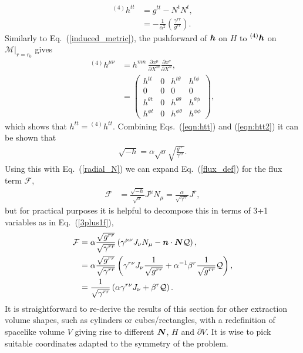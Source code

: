 \begin{align}
{}^{(4)}h^{tt} &=      g^{tt} - N^t N^t, \\
\label{eqn:htt2}&= -\frac{1}{\alpha^2}\left(\frac{\gamma^{rr}}{g^{rr}} \right).
\end{align}
Similarly to Eq.~(\ref{induced_metric}), the pushforward of $\boldsymbol h$ on $H$ to ${}^{(4)}\boldsymbol h$ on $\mathcal{M}\vert_{r=r_0}$ gives
\begin{align}
{}^{(4)} h^{\mu\nu}  &= h^{mn}\,\frac{\partial x^\mu}{\partial X^m} \frac{\partial x^\nu}{\partial X^n}, \\
 &= \begin{pmatrix} h^{tt}&0&h^{t\theta }&h^{t\phi} \\ 0&0&0&0 \\ h^{\theta t}&0&h^{\theta \theta }&h^{\theta \phi} \\ h^{\phi t}&0&h^{\phi\theta }&h^{\phi\phi} \end{pmatrix},
\end{align}
which shows that $h^{tt}={}^{(4)}h^{tt}$. Combining Eqs.~(\ref{eqn:htt}) and (\ref{eqn:htt2}) it can be shown that
\begin{align}
     \label{rootminushexpand}\sqrt{-h} = \alpha \sqrt{\sigma} \sqrt{\frac{g^{rr}}{\gamma^{rr}}}.
\end{align}
Using this with Eq.~(\ref{radial_N}) we can expand Eq.~(\ref{flux_def}) for the flux term $\mathcal{F}$, 
\begin{align}
 \label{spherical_flux}\mathcal{F}&=  \frac{\sqrt{-h}}{\sqrt{\sigma}} J^\mu N_\mu = \frac{\alpha}{\sqrt{\gamma^{rr}}} J^r, 
 \end{align}
 but for practical purposes it is helpful to decompose this in terms of 3+1 variables as in Eq.~(\ref{3plus1f}),
 \begin{align}
   \mathcal{F} &= \alpha\frac{\sqrt{g^{rr}}}{\sqrt{\gamma^{rr}}} \left(\gamma^{\mu\nu}J_\nu {N}_\mu - \boldsymbol{n} \cdot \boldsymbol{N} \mathcal{Q}\right), \\
                   &=  \alpha\frac{\sqrt{g^{rr}}}{\sqrt{\gamma^{rr}}}\left(\gamma^{r\nu}J_\nu \frac{1}{\sqrt{g^{rr}}} +\alpha^{-1}\beta^r\frac{1}{\sqrt{g^{rr}}} \mathcal{Q}\right), \\
\label{3plus1fluxspherical}   &= \frac{1}{\sqrt{\gamma^{rr}}}\left(\alpha\gamma^{r\nu}J_\nu  + \beta^r \mathcal{Q}\right).
\end{align}
It is straightforward to re-derive the results of this section for other extraction volume shapes, such as cylinders or cubes/rectangles, with a redefinition of spacelike volume $V$ giving rise to different $\boldsymbol{N}$, $H$ and $\partial V$. It is wise to pick suitable coordinates adapted to the symmetry of the problem.











